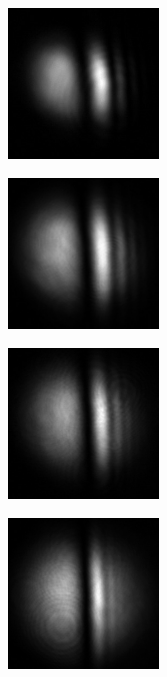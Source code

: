 \begin{figure}[ht]
  \begin{subfigure}[b]{4cm}
    \includegraphics[width=4cm,keepaspectratio]{interference/figures/move/123-7.jpg}\caption{}
  \end{subfigure}
  \begin{subfigure}[b]{4cm}
    \includegraphics[width=4cm,keepaspectratio]{interference/figures/move/123-5.jpg}\caption{}
  \end{subfigure}
  \begin{subfigure}[b]{4cm}
    \includegraphics[width=4cm,keepaspectratio]{interference/figures/move/123-3.jpg}\caption{}
  \end{subfigure}
  \begin{subfigure}[b]{4cm}
    \includegraphics[width=4cm,keepaspectratio]{interference/figures/move/123-2.jpg}\caption{}
  \end{subfigure}
  \begin{subfigure}[b]{4cm}

\end{subfigure}
\end{figure}
